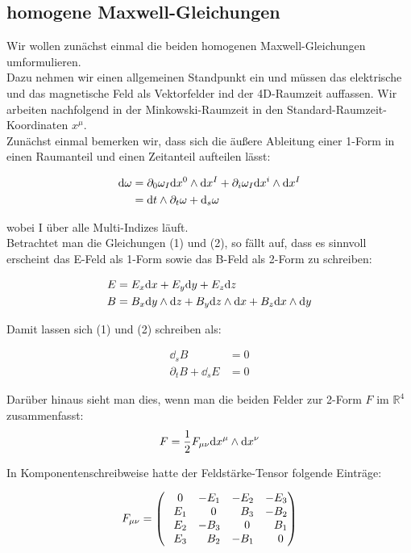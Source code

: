 \subsection{homogene Maxwell-Gleichungen}
Wir wollen zunächst einmal die beiden homogenen Maxwell-Gleichungen umformulieren. \\
Dazu nehmen wir einen allgemeinen Standpunkt ein und müssen das elektrische und das magnetische Feld als Vektorfelder ind der 4D-Raumzeit auffassen. Wir arbeiten nachfolgend in der Minkowski-Raumzeit in den Standard-Raumzeit-Koordinaten $x^{\mu}$. \\
Zunächst einmal bemerken wir, dass sich die äußere Ableitung einer 1-Form in einen Raumanteil und einen Zeitanteil aufteilen lässt:

\begin{align}
\dd \omega &= \partial_0 \omega_I \dd x^0 \wedge \dd x^{I} + \partial_i \omega_I \dd x^i \wedge \dd x^{I} \\
&= \dd t \wedge \partial_t \omega + \dd_s \omega 
\end{align}

wobei I über alle Multi-Indizes läuft. \\
Betrachtet man die Gleichungen (1) und (2), so fällt auf, dass es sinnvoll erscheint das E-Feld als 1-Form sowie das B-Feld als 2-Form zu schreiben:

\begin{align}
E &= E_x \dd x +E_y \dd y + E_z \dd z   \\
B &= B_x \dd y \wedge \dd z + B_y \dd z \wedge \dd x + B_z \dd x \wedge \dd y 
\end{align}

Damit lassen sich (1) und (2) schreiben als:

\begin{align}
\dd_s B &= 0 \\
\partial_t B + \dd_s E &=0
\end{align}

Darüber hinaus sieht man dies, wenn man die beiden Felder zur 2-Form $F$ im $\mathbb{R}^4$ zusammenfasst:
\begin{align}
F = \frac{1}{2} F_{\mu \nu} \dd x^{\mu} \wedge \dd x^{\nu}
\end{align}

In Komponentenschreibweise hatte der Feldstärke-Tensor folgende Einträge:

\begin{align}
F_{\mu \nu} =
\begin{pmatrix}
\phantom{-}0 & -E_1 & -E_2 & -E_3 \\
\phantom{-}E_1 & \phantom{-}0 & \phantom{-}B_3 & -B_2 \\
\phantom{-}E_2 & -B_3 & \phantom{-}0 & \phantom{-}B_1 \\
\phantom{-}E_3 & \phantom{-}B_2 & -B_1 & \phantom{-}0
\end{pmatrix}
\end{align}

